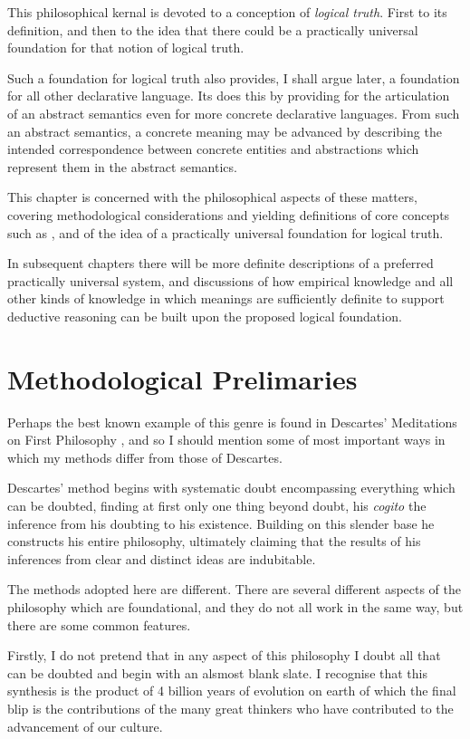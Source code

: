 
This philosophical kernal is devoted to a conception of \emph{logical truth}.
First to its definition, and then to the idea that there could be a practically universal foundation for that notion of logical truth.

Such a foundation for logical truth also provides, I shall argue later, a foundation for all other declarative language.
Its does this by providing for the articulation of an abstract semantics even for more concrete declarative languages.
From such an abstract semantics, a concrete meaning may be advanced by describing the intended correspondence between concrete entities and abstractions which represent them in the abstract semantics.

This chapter is concerned with the philosophical aspects of these matters, covering methodological considerations and yielding definitions of core concepts such as , and of the idea of a practically universal foundation for logical truth.

In subsequent chapters there will be more definite descriptions of a preferred practically universal system, and discussions of how empirical knowledge and all other kinds of knowledge in which meanings are sufficiently definite to support deductive reasoning can be built upon the proposed logical foundation.

\section{Methodological Prelimaries}

Perhaps the best known example of this genre is found in Descartes' Meditations on First Philosophy \cite{descartes2013meditations}, and so I should mention some of most important ways in which my methods differ from those of Descartes.

Descartes' method begins with systematic doubt encompassing everything which can be doubted, finding at first only one thing beyond doubt, his \emph{cogito} the inference from his doubting to his existence.
Building on this slender base he constructs his entire philosophy, ultimately claiming that the results of his inferences from clear and distinct ideas are indubitable.

The methods adopted here are different.
There are several different aspects of the philosophy which are foundational, and they do not all work in the same way, but there are some common features.

Firstly, I do not pretend that in any aspect of this philosophy I doubt all that can be doubted and begin with an alsmost blank slate.
I recognise that this synthesis is the product of 4 billion years of evolution on earth of which the final blip is the contributions of the many great thinkers who have contributed to the advancement of our culture.

